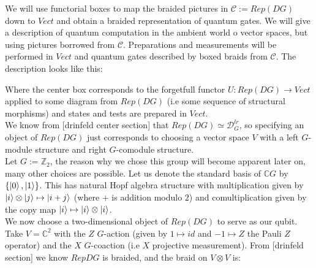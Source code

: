\documentclass{article}
\newcommand{\cat}{\mathcal{C}}
\begin{document}
We will use functorial boxes \cite{Mellies06} to map the braided pictures in $\cat := Rep(DG)$ down to $Vect$ and obtain a braided representation of quantum gates. We will give a description of quantum computation in the ambient world o vector spaces, but using pictures borrowed from $\cat$. Preparations and measurements will be performed in $Vect$ and quantum gates described by boxed braids from $\cat$. The description looks like this:
\begin{center}
\end{center}
Where the center box corresponds to the forgetfull functor $U: Rep(DG) \rightarrow Vect$ applied to some diagram from $Rep(DG)$ (i.e some sequence of structural morphisms) and states and tests are prepared in $Vect$.\\
We know from [drinfeld center section] that $Rep(DG) \simeq \mathcal{D}_G^{lr}$, so specifying an object of $Rep(DG)$ just corresponds to choosing a vector space $V$ with a left $G$-module structure  and right $G$-comodule structure.\\
Let $G:= \mathbb{Z}_2$, the reason why we chose this group will become apparent later on, many other choices are possible. Let us denote the standard basis of $\mathbb{C}G$ by $\{ \ket{0}, \ket{1}\}$. This has natural Hopf algebra structure with multiplication given by $\ket{i}\otimes \ket{j} \mapsto \ket{i+j}$ (where $+$ is addition modulo $2$) and comultiplication given by the copy map $\ket{i} \mapsto \ket{i}\otimes \ket{i} $.\\
We now choose a two-dimensional object of $Rep(DG)$ to serve as our qubit. Take $V=\mathbb{C}^2$ with the $Z$ $G$-action (given by $1 \mapsto id$ and $-1 \mapsto Z$ the Pauli $Z$ operator) and the $X$ $G$-coaction (i.e $X$ projective measurement). From [drinfeld section] we know $RepDG$ is braided, and the braid on $V \otimes V$ is:
\end{document}
